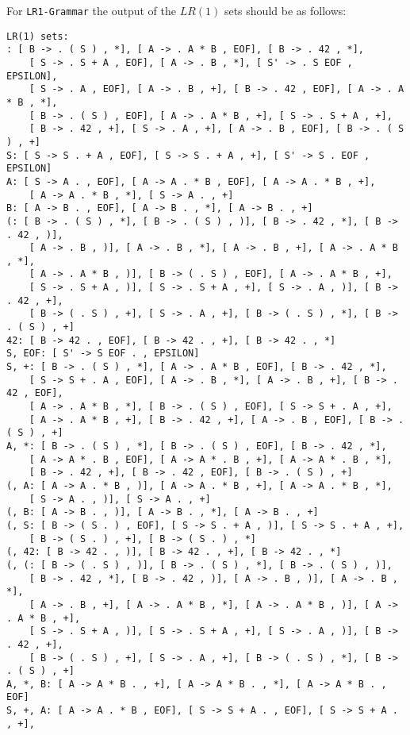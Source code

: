 \documentclass[a4paper]{article}
\begin{document}
\begin{exercise}{20}
\begin{itemize}
        For \texttt{LR1-Grammar} the output of the $LR(1)$ sets should be as follows:
    \begin{verbatim}
LR(1) sets:
: [ B -> . ( S ) , *], [ A -> . A * B , EOF], [ B -> . 42 , *], 
    [ S -> . S + A , EOF], [ A -> . B , *], [ S' -> . S EOF , EPSILON], 
    [ S -> . A , EOF], [ A -> . B , +], [ B -> . 42 , EOF], [ A -> . A * B , *], 
    [ B -> . ( S ) , EOF], [ A -> . A * B , +], [ S -> . S + A , +], 
    [ B -> . 42 , +], [ S -> . A , +], [ A -> . B , EOF], [ B -> . ( S ) , +]
S: [ S -> S . + A , EOF], [ S -> S . + A , +], [ S' -> S . EOF , EPSILON]
A: [ S -> A . , EOF], [ A -> A . * B , EOF], [ A -> A . * B , +], 
    [ A -> A . * B , *], [ S -> A . , +]
B: [ A -> B . , EOF], [ A -> B . , *], [ A -> B . , +]
(: [ B -> . ( S ) , *], [ B -> . ( S ) , )], [ B -> . 42 , *], [ B -> . 42 , )], 
    [ A -> . B , )], [ A -> . B , *], [ A -> . B , +], [ A -> . A * B , *], 
    [ A -> . A * B , )], [ B -> ( . S ) , EOF], [ A -> . A * B , +], 
    [ S -> . S + A , )], [ S -> . S + A , +], [ S -> . A , )], [ B -> . 42 , +], 
    [ B -> ( . S ) , +], [ S -> . A , +], [ B -> ( . S ) , *], [ B -> . ( S ) , +]
42: [ B -> 42 . , EOF], [ B -> 42 . , +], [ B -> 42 . , *]
S, EOF: [ S' -> S EOF . , EPSILON]
S, +: [ B -> . ( S ) , *], [ A -> . A * B , EOF], [ B -> . 42 , *], 
    [ S -> S + . A , EOF], [ A -> . B , *], [ A -> . B , +], [ B -> . 42 , EOF], 
    [ A -> . A * B , *], [ B -> . ( S ) , EOF], [ S -> S + . A , +], 
    [ A -> . A * B , +], [ B -> . 42 , +], [ A -> . B , EOF], [ B -> . ( S ) , +]
A, *: [ B -> . ( S ) , *], [ B -> . ( S ) , EOF], [ B -> . 42 , *], 
    [ A -> A * . B , EOF], [ A -> A * . B , +], [ A -> A * . B , *], 
    [ B -> . 42 , +], [ B -> . 42 , EOF], [ B -> . ( S ) , +]
(, A: [ A -> A . * B , )], [ A -> A . * B , +], [ A -> A . * B , *], 
    [ S -> A . , )], [ S -> A . , +]
(, B: [ A -> B . , )], [ A -> B . , *], [ A -> B . , +]
(, S: [ B -> ( S . ) , EOF], [ S -> S . + A , )], [ S -> S . + A , +], 
    [ B -> ( S . ) , +], [ B -> ( S . ) , *]
(, 42: [ B -> 42 . , )], [ B -> 42 . , +], [ B -> 42 . , *]
(, (: [ B -> ( . S ) , )], [ B -> . ( S ) , *], [ B -> . ( S ) , )], 
    [ B -> . 42 , *], [ B -> . 42 , )], [ A -> . B , )], [ A -> . B , *], 
    [ A -> . B , +], [ A -> . A * B , *], [ A -> . A * B , )], [ A -> . A * B , +], 
    [ S -> . S + A , )], [ S -> . S + A , +], [ S -> . A , )], [ B -> . 42 , +], 
    [ B -> ( . S ) , +], [ S -> . A , +], [ B -> ( . S ) , *], [ B -> . ( S ) , +]
A, *, B: [ A -> A * B . , +], [ A -> A * B . , *], [ A -> A * B . , EOF]
S, +, A: [ A -> A . * B , EOF], [ S -> S + A . , EOF], [ S -> S + A . , +], 

\end{verbatim}
\end{itemize}
\end{exercise}
\end{document}
